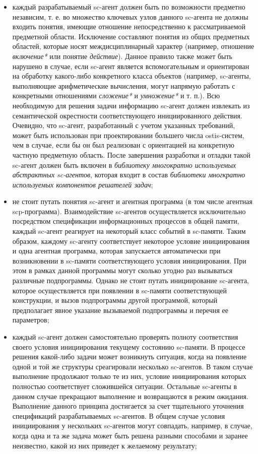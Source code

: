 \begin{itemize}
\item каждый разрабатываемый sc-агент должен быть по возможности предметно независим, т. е. во множество ключевых узлов данного sc-агента не должны входить понятия, имеющие отношение непосредственно к рассматриваемой предметной области. Исключение составляют понятия из общих предметных областей, которые носят междисциплинарный характер (например, отношение \textit{включение*} или понятие \textit{действие}). Данное правило также может быть нарушено в случае, если sc-агент является вспомогательным и ориентирован на обработку какого-либо конкретного класса объектов (например, sc-агенты, выполняющие арифметические вычисления, могут напрямую работать с конкретными отношениями \textit{сложение*} и \textit{умножение*} и т. п.). Всю необходимую для решения задачи информацию sc-агент должен извлекать из семантической окрестности соответствующего инициированного действия. Очевидно, что sc-агент, разработанный с учетом указанных требований, может быть использован при проектировании большего числа ostis-систем, чем в случае, если бы он был реализован с ориентацией на конкретную частную предметную область. После завершения разработки и отладки такой sc-агент должен быть включен в \textit{библиотеку многократно используемых абстрактных sc-агентов}, которая входит в состав \textit{библиотеки многкратно используемых компонентов решателей задач};
\item не стоит путать понятия sc-агент и агентная программа (в том числе агентная scp-программа). Взаимодействие sc-агентов осуществляется исключительно посредством спецификации информационных процессов в общей памяти, каждый sc-агент реагирует на некоторый класс событий в sc-памяти. Таким образом, каждому sc-агенту соответствует некоторое условие инициирования и одна агентная программа, которая запускается автоматически при возникновении в sc-памяти соответствующего условия инициирования. При этом в рамках данной программы могут сколько угодно раз вызываться различные подпрограммы. Однако не стоит путать инициирование sc-агента, которое осуществляется при появлении в sc-памяти соответствующей конструкции, и вызов подпрограммы другой программой, который предполагает явное указание вызываемой подпрограммы и перечня ее параметров;
\item каждый sc-агент должен самостоятельно проверять полноту соответствия своего условия инициирования текущему состоянию sc-памяти. В процессе решения какой-либо задачи может возникнуть ситуация, когда на появление одной и той же структуры среагировали несколько sc-агентов. В таком случае выполнение продолжают только те из них, условие инициирования которых полностью соответствует сложившейся ситуации. Остальные sc-агенты в данном случае прекращают выполнение и возвращаются в режим ожидания. Выполнение данного принципа достигается за счет тщательного уточнения спецификаций разрабатываемых sc-агентов. В общем случае условия инициирования у нескольких sc-агентов могут совпадать, например, в случае, когда одна и та же задача может быть решена разными способами и заранее неизвестно, какой из них приведет к желаемому результату;

\end{itemize}

